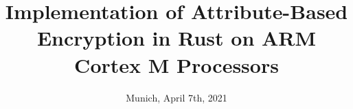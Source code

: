 %
% 
% 
%







\renewcommand{\PersonTitel}{}
\newcommand{\Datum}{\today}

\renewcommand{\PraesentationFusszeileZusatz}{| Bachelor's Thesis | Implementation of ABE in Rust on ARM Cortex M Processors}

\title{Implementation of Attribute-Based Encryption in Rust on ARM Cortex M Processors}
\author{\PersonTitel{} \PersonVorname{} \PersonNachname}
\institute[]{\UniversitaetName \\ \FakultaetName \\ \LehrstuhlName}
\date[\Datum]{Munich, April 7th, 2021}
\subject{Implementation of Attribute-Based Encryption in Rust on ARM Cortex M Processors}

\def\PolynomialSSS(#1){8 + 7 * #1 - 6 * #1^2 + #1 ^ 3}%




\PraesentationMasterStandard

